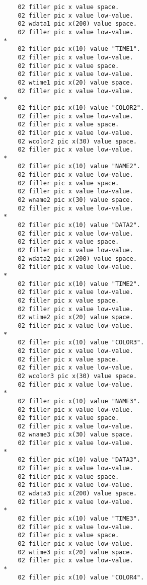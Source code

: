 {{{\begin{verbatim}
          02 filler pic x value space.
          02 filler pic x value low-value.
          02 wdata1 pic x(200) value space.
          02 filler pic x value low-value.
      *    
          02 filler pic x(10) value "TIME1".
          02 filler pic x value low-value.
          02 filler pic x value space.
          02 filler pic x value low-value.
          02 wtime1 pic x(20) value space.
          02 filler pic x value low-value.
      *    
          02 filler pic x(10) value "COLOR2".
          02 filler pic x value low-value.
          02 filler pic x value space.
          02 filler pic x value low-value.
          02 wcolor2 pic x(30) value space.
          02 filler pic x value low-value.
      *    
          02 filler pic x(10) value "NAME2".
          02 filler pic x value low-value.
          02 filler pic x value space.
          02 filler pic x value low-value.
          02 wname2 pic x(30) value space.
          02 filler pic x value low-value.
      *    
          02 filler pic x(10) value "DATA2".
          02 filler pic x value low-value.
          02 filler pic x value space.
          02 filler pic x value low-value.
          02 wdata2 pic x(200) value space.
          02 filler pic x value low-value.
      *    
          02 filler pic x(10) value "TIME2".
          02 filler pic x value low-value.
          02 filler pic x value space.
          02 filler pic x value low-value.
          02 wtime2 pic x(20) value space.
          02 filler pic x value low-value.
      *    
          02 filler pic x(10) value "COLOR3".
          02 filler pic x value low-value.
          02 filler pic x value space.
          02 filler pic x value low-value.
          02 wcolor3 pic x(30) value space.
          02 filler pic x value low-value.
      *    
          02 filler pic x(10) value "NAME3".
          02 filler pic x value low-value.
          02 filler pic x value space.
          02 filler pic x value low-value.
          02 wname3 pic x(30) value space.
          02 filler pic x value low-value.
      *    
          02 filler pic x(10) value "DATA3".
          02 filler pic x value low-value.
          02 filler pic x value space.
          02 filler pic x value low-value.
          02 wdata3 pic x(200) value space.
          02 filler pic x value low-value.
      *    
          02 filler pic x(10) value "TIME3".
          02 filler pic x value low-value.
          02 filler pic x value space.
          02 filler pic x value low-value.
          02 wtime3 pic x(20) value space.
          02 filler pic x value low-value.
      *    
          02 filler pic x(10) value "COLOR4".

\end{verbatim}}}}
